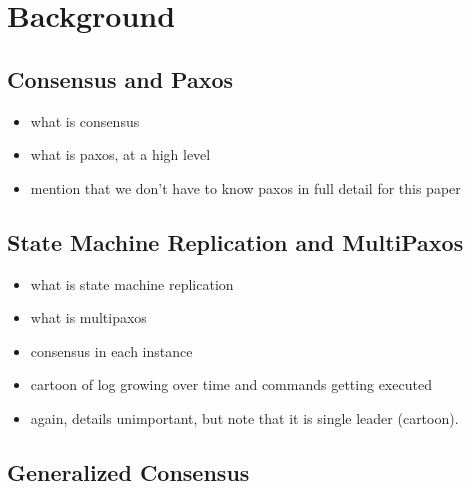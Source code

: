 \section{Background}

\subsection{Consensus and Paxos}
\begin{itemize}
  \item what is consensus
  \item what is paxos, at a high level
  \item mention that we don't have to know paxos in full detail for this paper
\end{itemize}

\subsection{State Machine Replication and MultiPaxos}
\begin{itemize}
  \item what is state machine replication
  \item what is multipaxos
  \item consensus in each instance
  \item cartoon of log growing over time and commands getting executed
  \item again, details unimportant, but note that it is single leader (cartoon).
\end{itemize}

{}

\subsection{Generalized Consensus}
